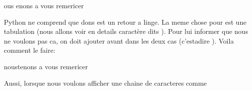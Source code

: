 \documentclass[letterpaper,10pt,french]{sphinxmanual}
\begin{document}
\begin{sphinxVerbatim}[commandchars=\\\{\}]
\end{sphinxVerbatim}

\begin{sphinxVerbatim}[commandchars=\\\{\}]
ous	enons a vous remericer
\end{sphinxVerbatim}

\sphinxAtStartPar
Python ne comprend que  dons  est un retour a linge. La meme chose pour  est une tabulation (nous allons voir en details caractère dits ). Pour lui informer que nous ne voulons pas ca, on doit ajouter \sphinxcode{\sphinxupquote{\textbackslash{}}} avant \sphinxcode{\sphinxupquote{\textbackslash{}}} dans les deux cas (c’est\sphinxhyphen{}a\sphinxhyphen{}dire \sphinxcode{\sphinxupquote{\textbackslash{}\textbackslash{}}}). Voila comment le faire:

\begin{sphinxVerbatim}[commandchars=\\\{\}]
\end{sphinxVerbatim}

\begin{sphinxVerbatim}[commandchars=\\\{\}]
\PYGZbs{}nous\PYGZbs{}tenons a vous remericer
\end{sphinxVerbatim}

\sphinxAtStartPar
Aussi, lorsque nous voulons afficher une chaine de caracteres comme 

\begin{sphinxVerbatim}[commandchars=\\\{\}]
 
\end{sphinxVerbatim}
\end{document}
